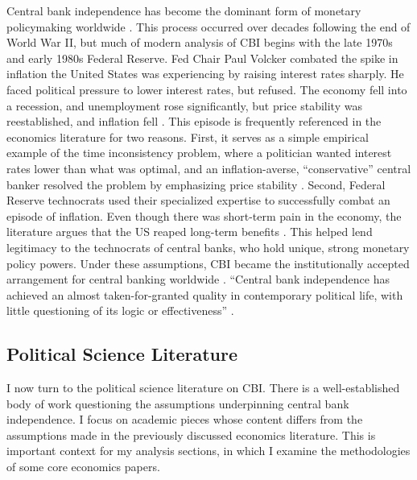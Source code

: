 \documentclass[12pt,a4paper]{article}
\begin{document}
\begin{doublespace}
Central bank independence has become the dominant form of monetary policymaking worldwide \parencite{crowe_evolution_2007}. This process occurred over decades following the end of World War II, but much of modern analysis of CBI begins with the late 1970s and early 1980s Federal Reserve. Fed Chair Paul Volcker combated the spike in inflation the United States was experiencing by raising interest rates sharply. He faced political pressure to lower interest rates, but refused. The economy fell into a recession, and unemployment rose significantly, but price stability was reestablished, and inflation fell  \parencite{goodfriend_incredible_2005}. This episode is frequently referenced in the economics literature for two reasons. First, it serves as a simple empirical example of the time inconsistency problem, where a politician wanted interest rates lower than what was optimal, and an inflation-averse, ``conservative” central banker resolved the problem by emphasizing price stability \parencite{mishkin_central_2008, goodfriend_incredible_2005}. Second, Federal Reserve technocrats used their specialized expertise to successfully combat an episode of inflation. Even though there was short-term pain in the economy, the literature argues that the US reaped long-term benefits \parencite[151]{alesina_central_1993}. This helped lend legitimacy to the technocrats of central banks, who hold unique, strong monetary policy powers. Under these assumptions, CBI became the institutionally accepted arrangement for central banking worldwide \parencite{crowe_evolution_2007}. ``Central bank independence has achieved an almost taken-for-granted quality in contemporary political life, with little questioning of its logic or effectiveness'' \parencite[47]{mcnamara_rational_2002}.


\subsection{Political Science Literature}

\label{sec:political_sci_lit}

I now turn to the political science literature on CBI. There is a well-established body of work questioning the assumptions underpinning central bank independence. I focus on academic pieces whose content differs from the assumptions made in the previously discussed economics literature. This is important context for my analysis sections, in which I examine the methodologies of some core economics papers.



\end{doublespace}
\end{document}
